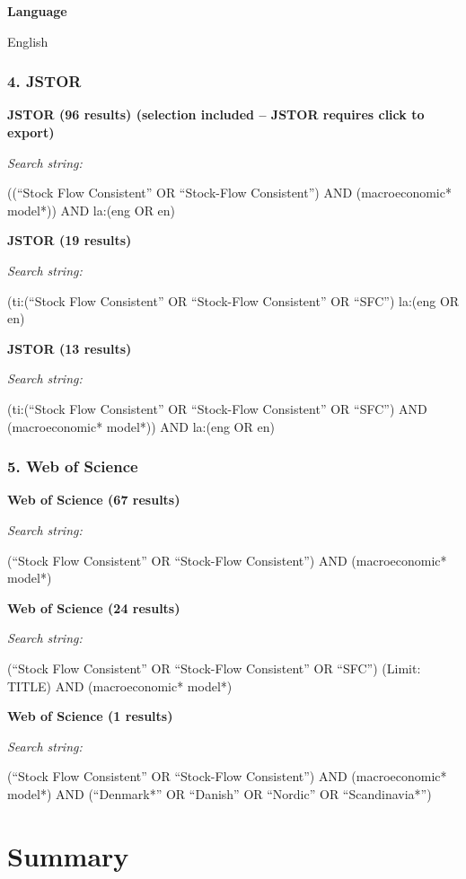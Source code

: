 \documentclass[
]{book}
\begin{document}
\textbf{Language}

English

\hypertarget{jstor}{%
\subsubsection{4. JSTOR}\label{jstor}}

\textbf{JSTOR (96 results) (selection included -- JSTOR requires click to export)}

\emph{Search string:}

((``Stock Flow Consistent'' OR ``Stock-Flow Consistent'') AND (macroeconomic* model*)) AND la:(eng OR en)

\textbf{JSTOR (19 results)}

\emph{Search string:}

(ti:(``Stock Flow Consistent'' OR ``Stock-Flow Consistent'' OR ``SFC'') la:(eng OR en)

\textbf{JSTOR (13 results)}

\emph{Search string:}

(ti:(``Stock Flow Consistent'' OR ``Stock-Flow Consistent'' OR ``SFC'') AND (macroeconomic* model*)) AND la:(eng OR en)

\hypertarget{web-of-science}{%
\subsubsection{5. Web of Science}\label{web-of-science}}

\textbf{Web of Science (67 results)}

\emph{Search string:}

(``Stock Flow Consistent'' OR ``Stock-Flow Consistent'')
AND
(macroeconomic* model*)

\textbf{Web of Science (24 results)}

\emph{Search string:}

(``Stock Flow Consistent'' OR ``Stock-Flow Consistent'' OR ``SFC'') (Limit: TITLE)
AND
(macroeconomic* model*)

\textbf{Web of Science (1 results)}

\emph{Search string:}

(``Stock Flow Consistent'' OR ``Stock-Flow Consistent'')
AND
(macroeconomic* model*)
AND
(``Denmark*'' OR ``Danish'' OR ``Nordic'' OR ``Scandinavia*'')

\hypertarget{summary}{%
\section{Summary}\label{summary}}
\end{document}
